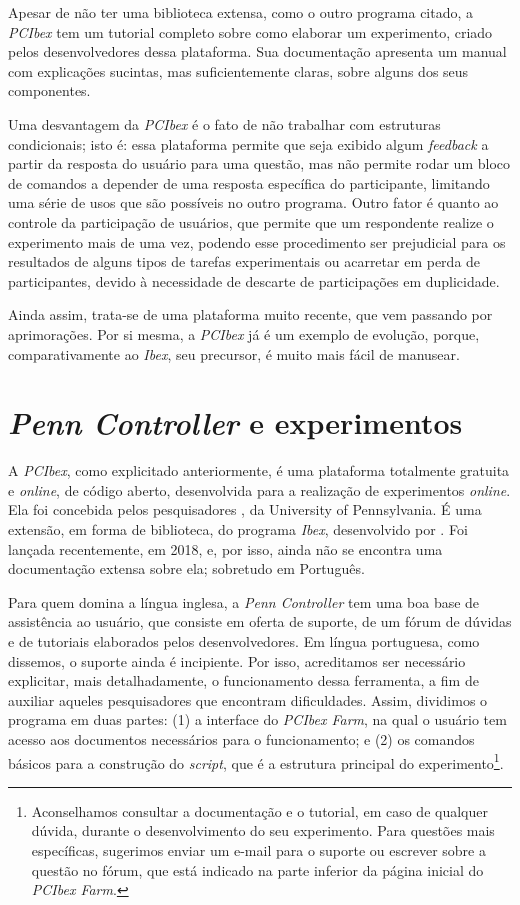 \documentclass{textolivre}
\begin{document}
Apesar de não ter uma biblioteca extensa, como o outro programa citado, a \emph{PCIbex} tem um tutorial completo sobre como elaborar um experimento, criado pelos desenvolvedores dessa plataforma. Sua documentação apresenta um manual com explicações sucintas, mas suficientemente claras, sobre alguns dos seus componentes.

Uma desvantagem da \emph{PCIbex} é o fato de não trabalhar com estruturas condicionais; isto é: essa plataforma permite que seja exibido algum \emph{feedback} a partir da resposta do usuário para uma questão, mas não permite rodar um bloco de comandos a depender de uma resposta específica do participante, limitando uma série de usos que são possíveis no outro programa. Outro fator é quanto ao controle da participação de usuários, que permite que um respondente realize o experimento mais de uma vez, podendo esse procedimento ser prejudicial para os resultados de alguns tipos de tarefas experimentais ou acarretar em perda de participantes, devido à necessidade de descarte de participações em duplicidade.

Ainda assim, trata-se de uma plataforma muito recente, que vem passando por aprimorações. Por si mesma, a \emph{PCIbex} já é um exemplo de evolução, porque, comparativamente ao \emph{Ibex}, seu precursor, é muito mais fácil de manusear.

\section{\emph{Penn Controller} e experimentos}\label{sec-penncontroller}
A \emph{PCIbex}, como explicitado anteriormente, é uma plataforma totalmente gratuita e \textit{online}, de código aberto, desenvolvida para a realização de experimentos \textit{online}. Ela foi concebida pelos pesquisadores \textcite{zehr2018}, da University of Pennsylvania. É uma extensão, em forma de biblioteca, do programa \emph{Ibex}, desenvolvido por \textcite{drummond}. Foi lançada recentemente, em 2018, e, por isso, ainda não se encontra uma documentação extensa sobre ela; sobretudo em Português.

Para quem domina a língua inglesa, a \emph{Penn Controller} tem uma boa base de assistência ao usuário, que consiste em oferta de suporte, de um fórum de dúvidas e de tutoriais elaborados pelos desenvolvedores. Em língua portuguesa, como dissemos, o suporte ainda é incipiente. Por isso, acreditamos ser necessário explicitar, mais detalhadamente, o funcionamento dessa ferramenta, a fim de auxiliar aqueles pesquisadores que encontram dificuldades. Assim, dividimos o programa em duas partes: (1) a interface do \emph{PCIbex Farm}, na qual o usuário tem acesso aos documentos necessários para o funcionamento; e (2) os comandos básicos para a construção do \emph{script}, que é a estrutura principal do experimento\footnote{Aconselhamos consultar a documentação e o tutorial, em caso de qualquer dúvida, durante o desenvolvimento do seu experimento. Para questões mais específicas, sugerimos enviar um e-mail para o suporte ou escrever sobre a questão no fórum, que está indicado na parte inferior da página inicial do \emph{PCIbex Farm}.}.
\end{document}
